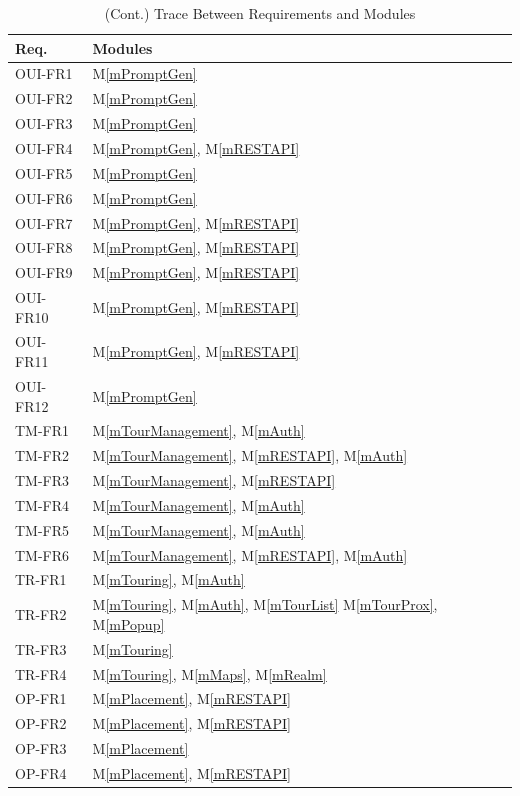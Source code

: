 \documentclass[12pt, titlepage]{article}
\newcommand{\mref}[1]{M\ref{#1}}
\begin{document}
\begin{table}[H]
\centering
\begin{tabular}{p{} p{}}
\toprule
\textbf{Req.} & \textbf{Modules}\\
\midrule
OUI-FR1 & \mref{mPromptGen}\\
OUI-FR2 & \mref{mPromptGen}\\
OUI-FR3 & \mref{mPromptGen}\\
OUI-FR4 & \mref{mPromptGen}, \mref{mRESTAPI}\\ 
OUI-FR5 & \mref{mPromptGen}\\
OUI-FR6 & \mref{mPromptGen}\\
OUI-FR7 & \mref{mPromptGen}, \mref{mRESTAPI}\\
OUI-FR8 & \mref{mPromptGen}, \mref{mRESTAPI}\\
OUI-FR9 & \mref{mPromptGen}, \mref{mRESTAPI}\\
OUI-FR10 & \mref{mPromptGen}, \mref{mRESTAPI}\\
OUI-FR11 & \mref{mPromptGen}, \mref{mRESTAPI}\\
OUI-FR12 & \mref{mPromptGen}\\
TM-FR1 & \mref{mTourManagement}, \mref{mAuth}\\
TM-FR2 & \mref{mTourManagement}, \mref{mRESTAPI}, \mref{mAuth}\\
TM-FR3 & \mref{mTourManagement}, \mref{mRESTAPI}\\
TM-FR4 & \mref{mTourManagement}, \mref{mAuth}\\
TM-FR5 & \mref{mTourManagement}, \mref{mAuth}\\
TM-FR6 & \mref{mTourManagement}, \mref{mRESTAPI}, \mref{mAuth}\\
TR-FR1 & \mref{mTouring}, \mref{mAuth}\\
TR-FR2 & \mref{mTouring}, \mref{mAuth}, \mref{mTourList} \mref{mTourProx}, \mref{mPopup}\\
TR-FR3 & \mref{mTouring}\\
TR-FR4 & \mref{mTouring}, \mref{mMaps}, \mref{mRealm}\\
OP-FR1 & \mref{mPlacement}, \mref{mRESTAPI}\\
OP-FR2 & \mref{mPlacement}, \mref{mRESTAPI}\\
OP-FR3 & \mref{mPlacement}\\
OP-FR4 & \mref{mPlacement}, \mref{mRESTAPI}\\
\bottomrule
\end{tabular}
\caption{(Cont.) Trace Between Requirements and Modules}
\label{TblRT}
\end{table}
\end{document}
